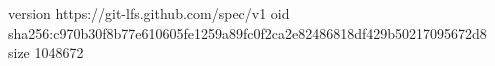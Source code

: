 version https://git-lfs.github.com/spec/v1
oid sha256:c970b30f8b77e610605fe1259a89fc0f2ca2e82486818df429b50217095672d8
size 1048672
